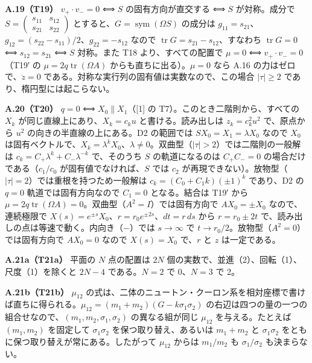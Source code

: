 \documentclass[
  a4paper,
]{ltjsarticle}
\begin{document}
\textbf{A.19（T19）} \(v_+\!\cdot v_-=0\) ⟺ \(S\) の固有方向が直交する ⟺
\(S\) が対称。成分で
\(S=\begin{pmatrix}s_{11}&s_{12}\\s_{21}&s_{22}\end{pmatrix}\)
とすると、\(G=\operatorname{sym}(\Omega S)\) の成分は
\(g_{11}=s_{21}\)、\(g_{12}=(s_{22}-s_{11})/2\)、\(g_{22}=-s_{12}\)
なので \(\operatorname{tr}G=s_{21}-s_{12}\)、すなわち
\(\operatorname{tr}G=0\) ⟺ \(s_{12}=s_{21}\) ⟺ \(S\) 対称。また T18
より、すべての配置で \(\mu=0\) ⟺ \(v_+\!\cdot v_-=0\)（T19′ の
\(\mu=2q\operatorname{tr}(\Omega A)\) からも直ちに出る）。\(\mu=0\) なら
A.16 の力はゼロで、\(\ddot z=0\)
である。対称な実行列の固有値は実数なので、この場合
\(\lvert\tau\rvert\ge2\) であり、楕円型には起こらない。

\textbf{A.20（T20）} \(q=0\) ⟺ \(X_0\parallel X_1\)（{[}1{]} の
T7）。このとき二階則から、すべての \(X_k\)
が同じ直線上にあり、\(X_k=c_ku\) と書ける。読み出しは \(z_k=c_k^2u^2\)
で、原点から \(u^2\) の向きの半直線の上にある。D2 の範囲では
\(SX_0=X_1=\lambda X_0\) なので \(X_0\)
は固有ベクトルで、\(X_k=\lambda^kX_0\)、\(\lambda\neq0\)。双曲型（\(\lvert\tau\rvert>2\)）では二階則の一般解は
\(c_k=C_+\lambda^k+C_-\lambda^{-k}\) で、そのうち \(S\) の軌道になるのは
\(C_+C_-=0\) の場合だけである（\(c_1/c_0\) が固有値でなければ、\(S\)
では \(c_2\)
が再現できない）。放物型（\(\lvert\tau\rvert=2\)）では重根を持つため一般解は
\(c_k=(C_0+C_1k)(\pm1)^k\) であり、D2 の \(q=0\) 軌道では固有方向なので
\(C_1=0\) となる。結合は T19′ から
\(\mu=2q\operatorname{tr}(\Omega A)=0\)。双曲型（\(A^2=I\)）では固有方向で
\(AX_0=\pm X_0\) なので、連続極限で
\(X(s)=e^{\pm s}X_0\)、\(r=r_0e^{\pm2s}\)、\(dt=r\,ds\) から
\(r=r_0\pm2t\) で、読み出しの点は等速で動く。内向き（\(-\)）では
\(s\to\infty\) で \(t\to r_0/2\)。放物型（\(A^2=0\)）では固有方向で
\(AX_0=0\) なので \(X(s)=X_0\) で、\(r\) と \(z\) は一定である。

\textbf{A.21a（T21a）} 平面の \(N\) 点の配置は \(2N\)
個の実数で、並進（2）、回転（1）、尺度（1）を除くと \(2N-4\)
である。\(N=2\) で 0、\(N=3\) で 2。

\textbf{A.21b（T21b）} \(\mu_{12}\)
の式は、二体のニュートン・クーロン系を相対座標で書けば直ちに得られる。\(\mu_{12}=(m_1+m_2)(G-k\sigma_1\sigma_2)\)
の右辺は四つの量の一つの組合せなので、\((m_1,m_2,\sigma_1,\sigma_2)\)
の異なる組が同じ \(\mu_{12}\) を与える。たとえば \((m_1,m_2)\)
を固定して \(\sigma_1\sigma_2\) を保つ取り替え、あるいは \(m_1+m_2\) と
\(\sigma_1\sigma_2\) をともに保つ取り替えが常にある。したがって
\(\mu_{12}\) からは \(m_1/m_2\) も \(\sigma_1/\sigma_2\) も決まらない。
\end{document}
